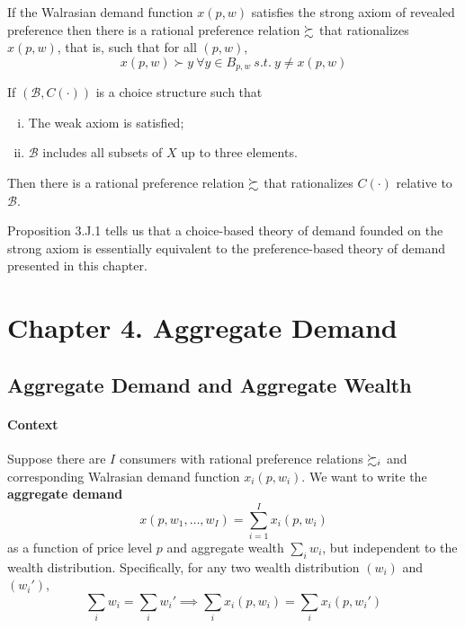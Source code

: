 \documentclass{report}
\begin{document}
 			\begin{proposition}[3.J.1]
 				If the Walrasian demand function $x(p, w)$ satisfies the strong axiom of revealed preference then there is a rational preference relation $\succsim$ that rationalizes $x(p, w)$, that is, such that for all $(p, w)$, 
 				\begin{equation}
 					x(p, w) \succ y\ \forall y \in B_{p, w}\ s.t.\ y \neq x(p, w)
 				\end{equation}
 			\end{proposition}
 			
			\begin{proposition}
				If $(\mathscr{B}, C(\cdot))$ is a choice structure such that
				\begin{enumerate}[(i)]
					\item The weak axiom is satisfied;
					\item $\mathscr{B}$ includes all subsets of $X$ up to three elements.
				\end{enumerate}
				Then there is a rational preference relation $\succsim$ that rationalizes $C(\cdot)$ relative to $\mathscr{B}$.
			\end{proposition}
 			
 			\begin{remark}
 				Proposition 3.J.1 tells us that a choice-based theory of demand founded on the strong axiom is essentially equivalent to the preference-based theory of demand presented in this chapter.
 			\end{remark}
 	
 	\section{Chapter 4. Aggregate Demand}
 		\subsection{Aggregate Demand and Aggregate Wealth}
	 		\paragraph{Context}Suppose there are $I$ consumers with rational preference relations $\succsim_i$ and corresponding Walrasian demand function $x_i(p, w_i)$. We want to write the \textbf{aggregate demand}
	 		\begin{equation}
	 			x\left(p, w_{1}, \ldots, w_{I}\right)=\sum_{i=1}^{I} x_{i}\left(p, w_{i}\right)
	 		\end{equation}
	 		as a function of price level $p$ and aggregate wealth $\sum_i w_i$, but independent to the wealth distribution. Specifically, for any two wealth distribution $(w_i)$ and $(w_i')$,
	 		\begin{equation}
	 			\sum_i w_i = \sum_i w_i' \implies \sum_i x_i(p, w_i) = \sum_i x_i(p, w_i')
	 		\end{equation}
	 		
\end{document}
